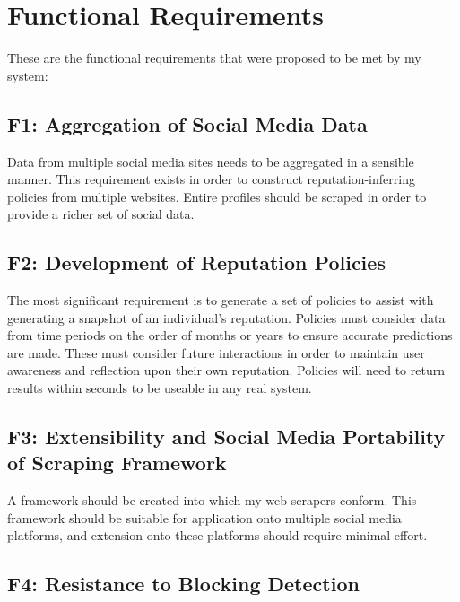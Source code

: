 \section{Functional Requirements}

These are the functional requirements that were proposed to be met by my system:

\subsection{F1: Aggregation of Social Media Data}

Data from multiple social media sites needs to be aggregated in a sensible manner. This requirement exists in order to construct reputation-inferring policies from multiple websites. Entire profiles should be scraped in order to provide a richer set of social data.

\subsection{F2: Development of Reputation Policies}

The most significant requirement is to generate a set of policies to assist with generating a snapshot of an individual's reputation. Policies must consider data from time periods on the order of months or years to ensure accurate predictions are made. These must consider future interactions in order to maintain user awareness and reflection upon their own reputation. Policies will need to return results within seconds to be useable in any real system. 


\subsection{ F3: Extensibility and Social Media Portability of Scraping Framework}

A framework should be created into which my web-scrapers conform. This framework should be suitable for application onto multiple social media platforms, and extension onto these platforms should require minimal effort. 


\subsection{ F4: Resistance to Blocking Detection}

